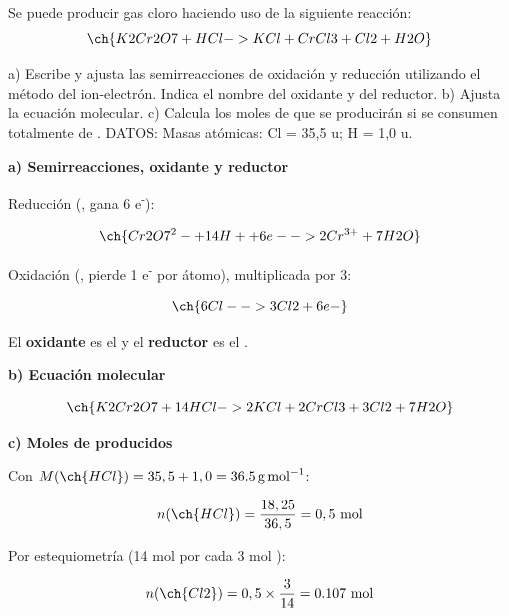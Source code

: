 \begin{exerciseEVAU}
    Se puede producir gas cloro haciendo uso de la siguiente reacción:
    \begin{equation*}
        \ch{K2Cr2O7 + HCl -> KCl + CrCl3 + Cl2 + H2O}
    \end{equation*}

    a) Escribe y ajusta las semirreacciones de oxidación y reducción utilizando el método del ion-electrón. Indica el nombre del oxidante y del reductor. b) Ajusta la ecuación molecular. c) Calcula los moles de  que se producirán si se consumen totalmente  de . DATOS: Masas atómicas: Cl = 35,5 u; H = 1,0 u.

    \begin{solu}


        \textbf{a) Semirreacciones, oxidante y reductor}

        Reducción (, gana 6 e\textsuperscript{-}):

        \begin{equation*}
            \ch{Cr2O7^2- + 14 H+ + 6 e- -> 2 Cr^{3+} + 7 H2O}
        \end{equation*}

        Oxidación (, pierde 1 e\textsuperscript{-} por átomo), multiplicada por 3:

        \begin{equation*}
            \ch{6 Cl- -> 3 Cl2 + 6 e-}
        \end{equation*}

        El \textbf{oxidante} es el  y el \textbf{reductor} es el .

        \textbf{b) Ecuación molecular}

        \begin{equation*}
            \ch{K2Cr2O7 + 14 HCl -> 2 KCl + 2 CrCl3 + 3 Cl2 + 7 H2O}
        \end{equation*}

        \textbf{c) Moles de  producidos}

        Con \(M(\ch{HCl}) = 35,5+1,0 = \SI{36.5}{\gram\per\mole}\):

        \begin{equation*}
            n(\ch{HCl}) = \dfrac{18,25}{36,5} = 0,5 \ \text{mol}
        \end{equation*}

        Por estequiometría (14 mol  por cada 3 mol ):

        \begin{equation*}
            n(\ch{Cl2}) = 0,5 \times \dfrac{3}{14} = \num{0.107} \ \text{mol}
        \end{equation*}

    \end{solu}
\end{exerciseEVAU}

